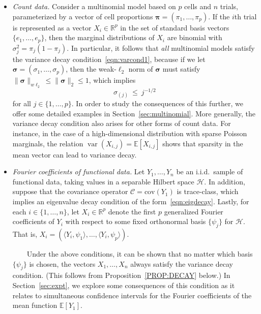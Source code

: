 \documentclass[aos,preprint]{imsart}
\numberwithin{equation}{section}
\theoremstyle{plain}
\newcommand{\R}{\mathbb{R}}
\newcommand{\E}{\mathbb{E}}
\newcommand{\var}{\operatorname{var}}
\newcommand{\1}{{\bf{1}}}
\newcommand{\0}{\mathbf{0}}
\begin{document}
\begin{itemize}
\item \emph{Count data.} Consider a multinomial model based on $p$ cells and $n$ trials, parameterized by a vector of cell proportions $\boldsymbol\pi=(\pi_1,\dots,\pi_p)$. If the $i$th trial is represented as a vector $X_i\in\R^p$ in the set of standard basis vectors $\{e_1,\dots,e_p\}$, then the marginal distributions of $X_i$ are binomial with $\sigma_j^2=\pi_j(1-\pi_j)$. In particular, it follows that \emph{all} multinomial models satisfy the variance decay condition~\eqref{eqn:varcond1}, because if we let $\boldsymbol \sigma=(\sigma_1,\dots,\sigma_p)$, then the weak-$\ell_2$ norm of $\boldsymbol \sigma$ must satisfy $\|\boldsymbol\sigma\|_{w\ell_2}\leq \|\boldsymbol\sigma\|_2\leq 1$, which implies
\begin{equation}
\sigma_{(j)} \ \leq \ j^{-1/2}
\end{equation}
for all $j\in\{1,\dots,p\}$. In order to study the consequences of this further, we offer some detailed examples in Section~\ref{sec:multinomial}.
More generally, the variance decay condition also arises for other forms of count data. For instance, in the case of a high-dimensional distribution with sparse Poisson marginals, the relation $\var(X_{i,j})=\E[X_{i,j}]$ shows that sparsity in the mean vector can lead to variance decay.\\[-0.2cm]



\item \emph{Fourier coefficients of functional data.} Let $Y_1,\dots,Y_n$ be an i.i.d.~sample of functional data, taking values in a separable Hilbert space $\mathcal{H}$. In addition, suppose that the covariance operator $\mathcal{C}=\text{cov}(Y_1)$ is trace-class, which implies an eigenvalue decay condition of the form~\eqref{eqn:eigdecay}.
Lastly, for each $i\in\{1,\dots,n\}$, let $X_i\in\R^p$ denote the first $p$ generalized Fourier coefficients of $Y_i$ with respect to some fixed orthonormal basis $\{\psi_j\}$ for $\mathcal{H}$. That is,
$X_i=(\langle Y_i,\psi_1\rangle,\dots,\langle Y_i,\psi_p\rangle).$

\ \ \ \ Under the above conditions, it can be shown that no matter which basis $\{\psi_j\}$ is chosen, the vectors $X_1,\dots, X_n$ always satisfy the variance decay condition. (This follows from Proposition~\ref{PROP:DECAY} below.)
 In Section~\ref{sec:expt}, we explore some consequences of this condition as it relates to simultaneous confidence intervals for the Fourier coefficients of the mean function $\E[Y_1]$.
%
\end{itemize}
%
%
%
%
\end{document}
